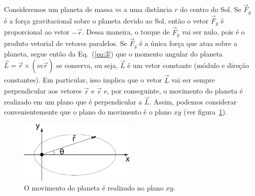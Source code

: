 \documentclass[12pt,a4paper]{article}
\theoremstyle{definition}
\begin{document}
Consideremos um planeta de massa $m$ a uma distância $r$ do centro do
Sol. Se $\vec F_g$ é a força gravitacional sobre o planeta devido ao
Sol, então o vetor $\vec F_g$ é proporcional ao vetor $-\vec r$. Dessa
maneira, o torque de $\vec F_g$ vai ser nulo, pois é o produto
vetorial de vetores paralelos. Se $\vec F_g$ é a única força que atua
sobre a planeta, segue então da Eq.~(\ref{eq:3}) que o momento angular
do planeta $\vec L=\vec r\times (m\dot{\vec r})$ se conserva, ou seja,
$\vec L$ é um vetor constante (módulo e direção constantes). Em
particular, isso implica que o vetor $\vec L$ vai ser sempre
perpendicular aos vetores $\vec r$ e $\dot{\vec r}$ e, por
conseguinte, o movimento do planeta é realizado em um plano que é
perpendicular a $\vec L$. Assim, podemos considerar convenientemente
que o plano do movimento é o plano $xy$ (ver
figura~\ref{fig:leikepler2r}).

\begin{figure}[t]
  \centering
  \includegraphics[width=0.5\textwidth,keepaspectratio]{aux/leikepler2r.pdf}
  \caption{O movimento do planeta é realizado no plano $xy$.}
  \label{fig:leikepler2r}
\end{figure}
\end{document}
